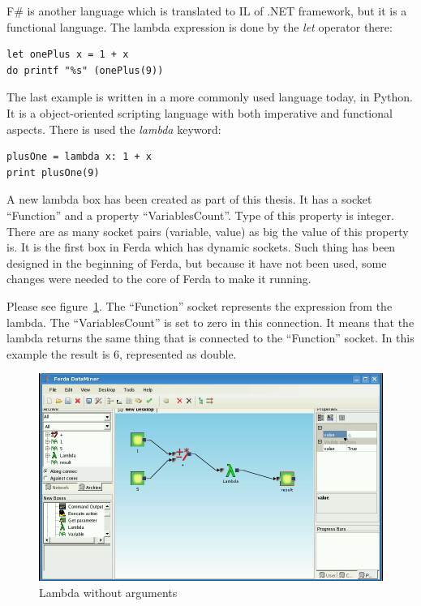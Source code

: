 \documentclass[a4paper,12pt]{book}
\begin{document}
F\# is another language which is translated to IL of .NET framework, but it is a functional language. The lambda expression is done by the \emph{let} operator there:
\begin{verbatim}
let onePlus x = 1 + x
do printf "%s" (onePlus(9)) 
\end{verbatim}

The last example is written in a more commonly used language today, in Python. It is a object-oriented scripting language with both imperative and functional aspects. There is used the \emph{lambda} keyword:
\begin{verbatim}
plusOne = lambda x: 1 + x
print plusOne(9)
\end{verbatim}

A new lambda box has been created as part of this thesis. It has a socket ``Function'' and a property ``VariablesCount''. Type of this property is integer. There are as many socket pairs (variable, value) as big the value of this property is. It is the first box in Ferda which has dynamic sockets. Such thing has been designed in the beginning of Ferda, but because it have not been used, some changes were needed to the core of Ferda to make it running.

Please see figure~\ref{fig:boxLambdaBasic}. The ``Function'' socket represents the expression from the lambda. The ``VariablesCount'' is set to zero in this connection. It means that the lambda returns the same thing that is connected to the ``Function'' socket. In this example the result is 6, represented as double. 
\begin{figure}
	\includegraphics[width=1\textwidth]{lambdaBasic2.png}
	\caption{Lambda without arguments}
	\label{fig:boxLambdaBasic}
\end{figure}
\end{document}
